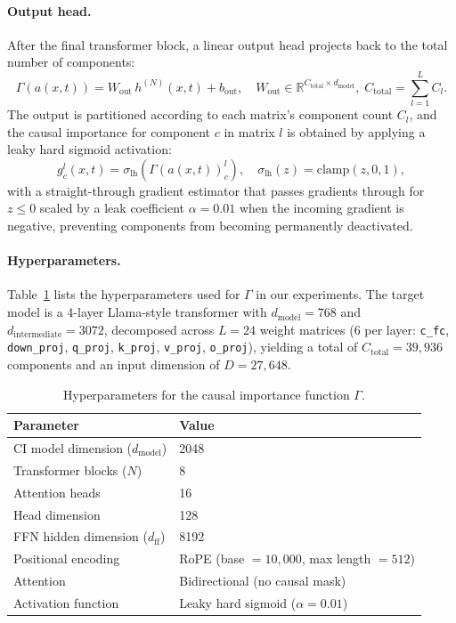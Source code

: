 \documentclass{article}
\begin{document}
\paragraph{Output head.}
After the final transformer block, a linear output head projects back to the total number of
components:
\begin{equation}
  \Gamma(a(x,t)) = W_{\mathrm{out}} \, h^{(N)}(x,t) + b_{\mathrm{out}},
  \quad W_{\mathrm{out}} \in \mathbb{R}^{C_{\mathrm{total}} \times d_{\mathrm{model}}}, \;
  C_{\mathrm{total}} = \sum_{l=1}^{L} C_l.
\end{equation}
The output is partitioned according to each matrix's component count $C_l$, and the causal
importance for component $c$ in matrix $l$ is obtained by applying a leaky hard sigmoid
activation:
\begin{equation}
  g^l_c(x, t) = \sigma_{\mathrm{lh}}\!\left(\Gamma(a(x,t))^l_c\right),
  \quad \sigma_{\mathrm{lh}}(z) = \mathrm{clamp}(z, 0, 1),
\end{equation}
with a straight-through gradient estimator that passes gradients through for $z \leq 0$ scaled
by a leak coefficient $\alpha = 0.01$ when the incoming gradient is negative, preventing
components from becoming permanently deactivated.

\paragraph{Hyperparameters.}
Table~\ref{tab:ci-hyperparams} lists the hyperparameters used for $\Gamma$ in our experiments.
The target model is a 4-layer Llama-style transformer with $d_{\mathrm{model}} = 768$ and
$d_{\mathrm{intermediate}} = 3072$, decomposed across $L = 24$ weight matrices
(6 per layer: \texttt{c\_fc}, \texttt{down\_proj}, \texttt{q\_proj}, \texttt{k\_proj},
\texttt{v\_proj}, \texttt{o\_proj}), yielding a total of $C_{\mathrm{total}} = 39{,}936$
components and an input dimension of $D = 27{,}648$.

\begin{table}[h]
\centering
\begin{tabular}{ll}
\toprule
\textbf{Parameter} & \textbf{Value} \\
\midrule
CI model dimension ($d_{\mathrm{model}}$) & 2048 \\
Transformer blocks ($N$)                  & 8 \\
Attention heads                           & 16 \\
Head dimension                            & 128 \\
FFN hidden dimension ($d_{\mathrm{ff}}$)  & 8192 \\
Positional encoding                       & RoPE (base $= 10{,}000$, max length $= 512$) \\
Attention                                 & Bidirectional (no causal mask) \\
Activation function                       & Leaky hard sigmoid ($\alpha = 0.01$) \\
\bottomrule
\end{tabular}
\caption{Hyperparameters for the causal importance function $\Gamma$.}
\label{tab:ci-hyperparams}
\end{table}
\end{document}
